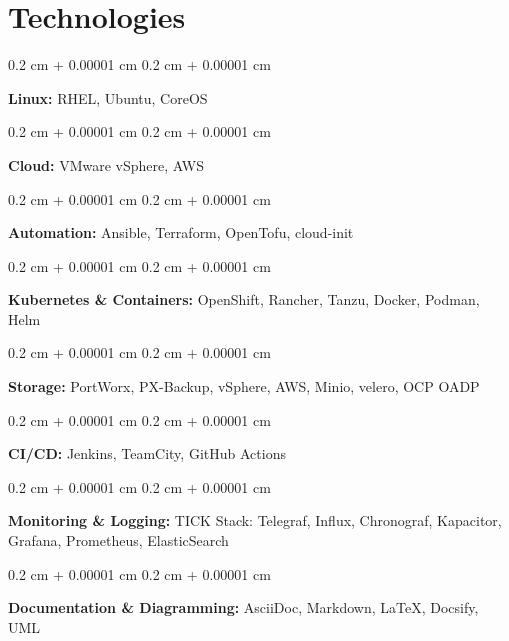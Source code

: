 \documentclass[10pt, letterpaper]{article}
\newenvironment{onecolentry}{
  \begin{adjustwidth}{
      0.2 cm + 0.00001 cm
    }{
      0.2 cm + 0.00001 cm
    }
  }{
  \end{adjustwidth}
} %
\begin{document}
\section{Technologies}

\begin{onecolentry}
  \textbf{Linux:} RHEL, Ubuntu, CoreOS
\end{onecolentry}


\begin{onecolentry}
  \textbf{Cloud:} VMware vSphere, AWS
\end{onecolentry}


\begin{onecolentry}
  \textbf{Automation:} Ansible, Terraform, OpenTofu, cloud-init
\end{onecolentry}


\begin{onecolentry}
  \textbf{Kubernetes \& Containers:} OpenShift, Rancher, Tanzu,
  Docker, Podman, Helm
\end{onecolentry}


\begin{onecolentry}
  \textbf{Storage:} PortWorx, PX-Backup, vSphere, AWS, Minio, velero, OCP OADP
\end{onecolentry}


\begin{onecolentry}
  \textbf{CI/CD:} Jenkins, TeamCity, GitHub Actions
\end{onecolentry}


\begin{onecolentry}
  \textbf{Monitoring \& Logging:} TICK Stack: Telegraf, Influx,
  Chronograf, Kapacitor,
  Grafana, Prometheus, ElasticSearch
\end{onecolentry}


\begin{onecolentry}
  \textbf{Documentation \& Diagramming:} AsciiDoc, Markdown, LaTeX, Docsify, UML
\end{onecolentry}
\end{document}
